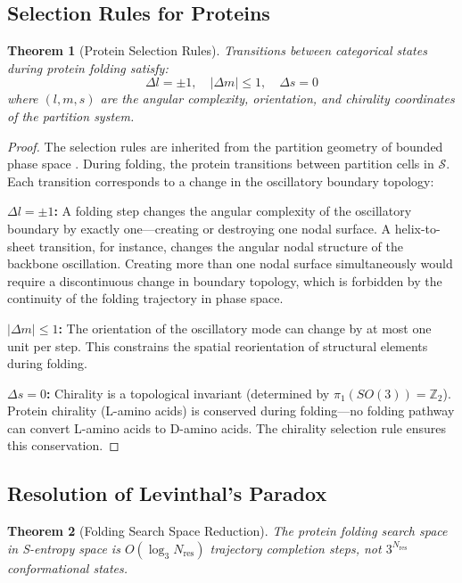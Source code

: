 \documentclass[11pt,twocolumn,a4paper]{article}
\newtheorem{theorem}{Theorem}[section]
\theoremstyle{definition}
\theoremstyle{remark}
\newcommand{\Sspace}{\mathcal{S}}
\newcommand{\Integer}{\mathbb{Z}}
\newcommand{\Nres}{N_{\mathrm{res}}}
\begin{document}
\subsection{Selection Rules for Proteins}

\begin{theorem}[Protein Selection Rules]
\label{thm:selection_protein}
Transitions between categorical states during protein folding satisfy:
\begin{equation}
\Delta l = \pm 1, \quad |\Delta m| \leq 1, \quad \Delta s = 0
\label{eq:selection_rules}
\end{equation}
where $(l, m, s)$ are the angular complexity, orientation, and chirality coordinates of the partition system.
\end{theorem}

\begin{proof}
The selection rules are inherited from the partition geometry of bounded phase space \citep{sachikonye2025b}. During folding, the protein transitions between partition cells in $\Sspace$. Each transition corresponds to a change in the oscillatory boundary topology:

\textbf{$\Delta l = \pm 1$:} A folding step changes the angular complexity of the oscillatory boundary by exactly one---creating or destroying one nodal surface. A helix-to-sheet transition, for instance, changes the angular nodal structure of the backbone oscillation. Creating more than one nodal surface simultaneously would require a discontinuous change in boundary topology, which is forbidden by the continuity of the folding trajectory in phase space.

\textbf{$|\Delta m| \leq 1$:} The orientation of the oscillatory mode can change by at most one unit per step. This constrains the spatial reorientation of structural elements during folding.

\textbf{$\Delta s = 0$:} Chirality is a topological invariant (determined by $\pi_1(SO(3)) = \Integer_2$). Protein chirality (L-amino acids) is conserved during folding---no folding pathway can convert L-amino acids to D-amino acids. The chirality selection rule ensures this conservation.
\end{proof}

\subsection{Resolution of Levinthal's Paradox}

\begin{theorem}[Folding Search Space Reduction]
\label{thm:levinthal}
The protein folding search space in S-entropy space is $O(\log_3 \Nres)$ trajectory completion steps, not $3^{\Nres}$ conformational states.
\end{theorem}
\end{document}
